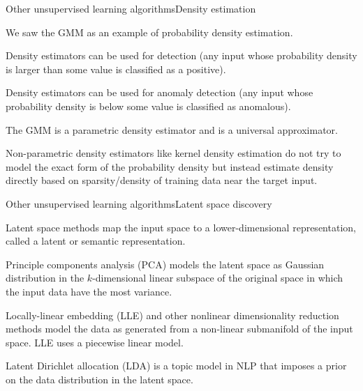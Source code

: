 \documentclass{beamer}
\begin{document}
\begin{frame}{Other unsupervised learning algorithms}{Density estimation}

  We saw the GMM as an example of \alert{probability density estimation}.

  \medskip

  Density estimators can be used for \alert{detection} (any input whose
  probability density is larger than some value is classified as a positive).

  \medskip

  Density estimators can be used for \alert{anomaly detection}
  (any input whose probability density is below some value is classified
  as anomalous).

  \medskip

  The GMM is a \alert{parametric density estimator} and is a \alert{universal
  approximator}.

  \medskip

  \alert{Non-parametric density estimators} like kernel density estimation
  do not try to model the exact form of the probability density but instead
  estimate density directly based on sparsity/density of training data
  near the target input.

\end{frame}


\begin{frame}{Other unsupervised learning algorithms}{Latent space discovery}

  \alert{Latent space} methods map 
  the input space to a lower-dimensional representation, called
  a \alert{latent} or \alert{semantic} representation.

  \medskip

  \alert{Principle components analysis}
  (PCA) models the latent space as Gaussian
  distribution in the $k$-dimensional linear subspace of the original space
  in which the input data have the most variance.

  \medskip

  \alert{Locally-linear embedding} (LLE) and other
  nonlinear dimensionality reduction methods
  model the data as generated from a non-linear
  submanifold of the input space. LLE uses a piecewise linear model.

  \medskip

  \alert{Latent Dirichlet allocation} (LDA)
  is a \alert{topic model} in NLP that
  imposes a prior on the data distribution in the latent space.

\end{frame}
\end{document}

